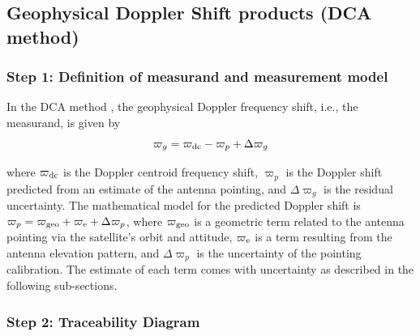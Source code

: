 \subsection{Geophysical Doppler Shift products (DCA method)}

\subsubsection{Step 1: Definition of measurand and measurement model}

In the \ac{DCA} method \cite{chapron05}, the geophysical Doppler frequency
shift, i.e., the measurand, is given by
\begin{equation}
  \varpi_g = \varpi_{\rm dc} - \varpi_p + \Delta\varpi_g
  \label{eq:DCcomponents}
\end{equation}

\noindent where $\varpi_{\rm dc}$ is the Doppler centroid frequency shift,
$\varpi_p$ is the Doppler shift predicted from an estimate of the antenna
pointing, and $\Delta\varpi_g$ is the residual uncertainty. The mathematical
model for the predicted Doppler shift is $\varpi_p = \varpi_{\rm geo} +
\varpi_{\rm e} + \Delta\varpi_p$, where $\varpi_{\rm geo}$ is a geometric term
related to the antenna pointing via the satellite's orbit and attitude,
$\varpi_{\rm e}$ is a term resulting from the antenna elevation pattern, and
$\Delta\varpi_p$ is the uncertainty of the pointing calibration. The estimate
of each term comes with uncertainty as described in the following sub-sections.

\subsubsection{Step 2: Traceability Diagram}

